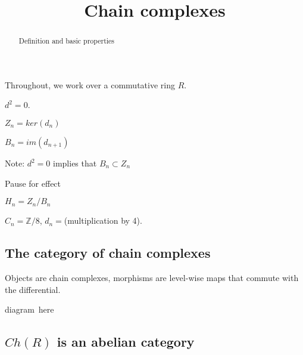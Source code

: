 \documentclass{ximera}
\title{Chain complexes}
\begin{document}
\begin{abstract}
  Definition and basic properties
\end{abstract}
\maketitle

Throughout, we work over a commutative ring $R$.

\begin{definition}
  $d^2 = 0$.
\end{definition}

\begin{definition}[Cycles]
  $Z_n = ker(d_n)$
\end{definition}

\begin{definition}[Boundaries]
  $B_n = im(d_{n+1})$
\end{definition}

Note: $d^2 = 0$ implies that $B_n \subset Z_n$

\begin{center}
  Pause for effect
\end{center}

\begin{definition}[Homology]
  $H_n = Z_n/B_n$ 
\end{definition}

\begin{example}
  $C_n = \mathbb{Z}/8$, $d_n = $(multiplication by 4).
\end{example}

\subsection{The category of chain complexes}

Objects are chain complexes, morphisms are level-wise maps that
commute with the differential.

\begin{image}
  diagram\ here
\end{image}

\subsection{$Ch(R)$ is an abelian category}
\end{document}
